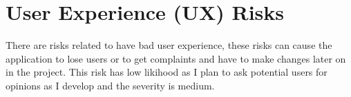 \documentclass[]{project_report}
\begin{document}
\section{User Experience (UX) Risks}
There are risks related to have bad user experience, these risks can cause the application to lose users or to get complaints and have to make changes later on in the project. This risk has low likihood as I plan to ask potential users for opinions as I develop and the severity is medium.

\newpage
\begin{thebibliography}{99}


\end{thebibliography}
\label{endpage}
\end{document}
